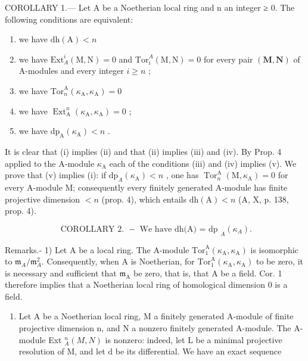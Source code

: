 COROLLARY 1.--- Let A be a Noetherian local ring and n an integer ≥ 0. The following conditions are equivalent:

\begin{enumerate}
\def\labelenumi{(\roman{enumi})}
\item
  we have \(\mathrm{dh}(\mathrm{A}) < n\)
\item
  we have \(\mathrm{Ext}_{A}^{i}(\mathrm{M},\mathrm{N}) = 0\) and \(\mathrm{Tor}_i^A (\mathrm{M},\mathrm{N}) = 0\) for every pair \((\mathbf{M},\mathbf{N})\) of A-modules and every integer \(i\geqslant n\) ;
\item
  we have \(\mathrm{Tor}_n^{\mathrm{A}}(\kappa_{\mathrm{A}},\kappa_{\mathrm{A}}) = 0\)
\item
  we have \(\operatorname{Ext}_{\mathrm{A}}^{n}(\kappa_{\mathrm{A}},\kappa_{\mathrm{A}}) = 0\) ;
\item
  we have \(\mathrm{dp}_{\mathrm{A}}(\kappa_{\mathrm{A}}) < n\) .
\end{enumerate}

It is clear that (i) implies (ii) and that (ii) implies (iii) and (iv). By Prop. 4 applied to the A-module \(\kappa_{\mathrm{A}}\) each of the conditions (iii) and (iv) implies (v). We prove that (v) implies (i): if \(\mathrm{dp}_{A}(\kappa_{\mathrm{A}}) < n\) , one has \(\operatorname{Tor}_{n}^{\mathrm{A}}(\mathrm{M}, \kappa_{\mathrm{A}}) = 0\) for every A-module M; consequently every finitely generated A-module has finite projective dimension \(< n\) (prop. 4), which entails \(\mathrm{dh}(\mathrm{A}) < n\) (A, X, p. 138, prop. 4).

\[
\text { COROLLARY   2. } - \text { We   have   dh(A) = dp } _ {A} (\kappa_ {A})  .
\]

Remarks.- 1) Let A be a local ring. The A-module \(\mathrm{Tor}_{1}^{\mathrm{A}}(\kappa_{\mathrm{A}},\kappa_{\mathrm{A}})\) is isomorphic to \(\mathfrak{m}_{A}/\mathfrak{m}_{A}^{2}\). Consequently, when A is Noetherian, for \(\mathrm{Tor}_{1}^{\mathrm{A}}(\kappa_{\mathrm{A}},\kappa_{\mathrm{A}})\) to be zero, it is necessary and sufficient that \(\mathfrak{m}_{\mathrm{A}}\) be zero, that is, that A be a field. Cor. 1 therefore implies that a Noetherian local ring of homological dimension 0 is a field.

\begin{enumerate}
\def\labelenumi{\arabic{enumi})}
\setcounter{enumi}{1}
\tightlist
\item
  Let A be a Noetherian local ring, M a finitely generated A-module of finite projective dimension n, and N a nonzero finitely generated A-module. The A-module Ext \(_{A}^{n}(M,N)\) is nonzero: indeed, let L be a minimal projective resolution of M, and let d be its differential. We have an exact sequence
\end{enumerate}

